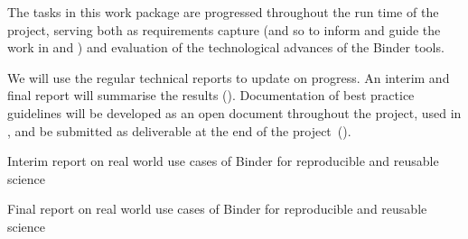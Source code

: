 \begin{workpackage}
\begin{wpdescription}
  \medskip

  The tasks in this work package are progressed throughout the run time of the
  project, serving both as requirements capture (and so to inform and guide the
  work in  and ) and evaluation of the
  technological advances of the Binder tools.

  We will use the regular technical reports to update on progress. An
  interim  and final
  report will summarise the results ().
  Documentation of best practice guidelines will be developed as an open
  document throughout the project, used in , and be submitted
  as deliverable at the end of the project~().
\end{wpdescription}

\begin{tasklist}


%



\end{tasklist}


\begin{wpdelivs}
  \begin{wpdeliv}[
    id=report-use-cases-interim,
    lead=MP,
    due=18,
    dissem=PU,
    nature=DEC,
    ]
    {
      Interim report on real world use cases of Binder for reproducible and reusable science
    }
  \end{wpdeliv}

  \begin{wpdeliv}[
    id=report-use-cases,
    lead=MP,
    due=34,
    dissem=PU,
    nature=DEC,
    ]
    {
      Final report on real world use cases of Binder for reproducible and reusable science
    }
  \end{wpdeliv}



\end{wpdelivs}
\end{workpackage}

